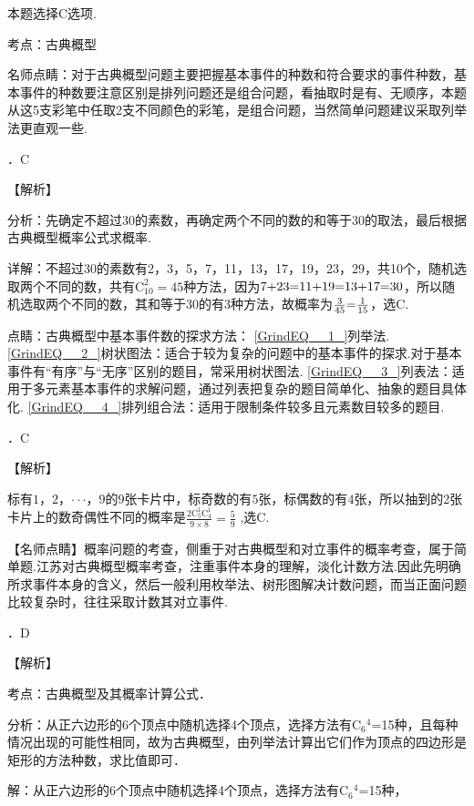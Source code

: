 \noindent 本题选择C选项.

\noindent 考点：古典概型

\noindent 名师点睛：对于古典概型问题主要把握基本事件的种数和符合要求的事件种数，基本事件的种数要注意区别是排列问题还是组合问题，看抽取时是有、无顺序，本题从这5支彩笔中任取2支不同颜色的彩笔，是组合问题，当然简单问题建议采取列举法更直观一些.

．C

\noindent 【解析】

\noindent 分析：先确定不超过30的素数，再确定两个不同的数的和等于30的取法，最后根据古典概型概率公式求概率.

\noindent 详解：不超过30的素数有2，3，5，7，11，13，17，19，23，29，共10个，随机选取两个不同的数，共有$\mathrm C_{10}^{2} =45$种方法，因为$7{\rm +}23{\rm =}11{\rm +}19{\rm =}13{\rm +}17{\rm =}30$，所以随机选取两个不同的数，其和等于30的有3种方法，故概率为$\frac{3}{45} {\rm =}\frac{1}{15} $，选C.

\noindent 点睛：古典概型中基本事件数的探求方法： \eqref{GrindEQ__1_}列举法. \eqref{GrindEQ__2_}树状图法：适合于较为复杂的问题中的基本事件的探求.对于基本事件有``有序''与``无序''区别的题目，常采用树状图法. \eqref{GrindEQ__3_}列表法：适用于多元素基本事件的求解问题，通过列表把复杂的题目简单化、抽象的题目具体化. \eqref{GrindEQ__4_}排列组合法：适用于限制条件较多且元素数目较多的题目.

．C

\noindent 【解析】

\noindent 标有$1$，$2$，$\cdot \cdot \cdot $，$9$的$9$张卡片中，标奇数的有$5$张，标偶数的有$4$张，所以抽到的2张卡片上的数奇偶性不同的概率是$\frac{2\mathrm C_{5}^{1} \mathrm C_{4}^{1} }{9\times 8} =\frac{5}{9} $ ,选C.

\noindent 【名师点睛】概率问题的考查，侧重于对古典概型和对立事件的概率考查，属于简单题.江苏对古典概型概率考查，注重事件本身的理解，淡化计数方法.因此先明确所求事件本身的含义，然后一般利用枚举法、树形图解决计数问题，而当正面问题比较复杂时，往往采取计数其对立事件.

．D

\noindent 【解析】

\noindent 考点：古典概型及其概率计算公式．

\noindent 分析：从正六边形的6个顶点中随机选择4个顶点，选择方法有C${}_{6}$${}^{4}$=15种，且每种情况出现的可能性相同，故为古典概型，由列举法计算出它们作为顶点的四边形是矩形的方法种数，求比值即可．

\noindent 解：从正六边形的6个顶点中随机选择4个顶点，选择方法有C${}_{6}$${}^{4}$=15种，


